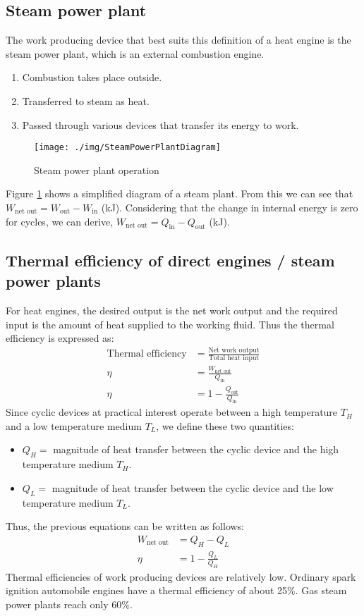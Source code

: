 \subsection{Steam power plant}
The work producing device that best suits this definition of a heat engine is the steam power plant, which is an external combustion engine.
\begin{enumerate}[noitemsep]
  \item Combustion takes place outside.
  \item Transferred to steam as heat.
  \item Passed through various devices that transfer its energy to work.
\end{enumerate}
\begin{figure}[H]
  \centering
  \texttt{[image: ./img/SteamPowerPlantDiagram]}
  \caption{Steam power plant operation}
  \label{steampowerplant}
\end{figure}
Figure \ref{steampowerplant} shows a simplified diagram of a steam plant. From this we can see that \(W_{\textrm{net out}} = W_{\textrm{out}} - W_{\textrm{in}}\) (\si{\kilo\joule}). Considering that the change in internal energy is zero for cycles, we can derive, \(W_{\textrm{net out}} = Q_{\textrm{in}} - Q_{\textrm{out}}\) (\si{\kilo\joule}).
\subsection{Thermal efficiency of direct engines / steam power plants}
For heat engines, the desired output is the net work output and the required input is the amount of heat supplied to the working fluid. Thus the thermal efficiency is expressed as:
\begin{align}
  \textrm{Thermal efficiency} & = \frac{\textrm{Net work output}}{\textrm{Total heat input}} \\
  \eta                        & = \frac{W_{\textrm{net out}}}{Q_{\textrm{in}}}               \\
  \eta                        & = 1 - \frac{Q_{\textrm{out}}}{Q_{\textrm{in}}}
\end{align}
Since cyclic devices at practical interest operate between a high temperature \(T_H\) and a low temperature medium \(T_L\), we define these two quantities:
\begin{itemize}
  \item {\(Q_H =\)} magnitude of heat transfer between the cyclic device and the high temperature medium \(T_H\).
  \item {\(Q_L =\)} magnitude of heat transfer between the cyclic device and the low temperature medium \(T_L\).
\end{itemize}
Thus, the previous equations can be written as follows:
\begin{align}
  W_{\textrm{net out}} & = Q_H - Q_L           \\
  \eta                 & = 1 - \frac{Q_L}{Q_H}
\end{align}
Thermal efficiencies of work producing devices are relatively low. Ordinary spark ignition automobile engines have a thermal efficiency of about 25\%. Gas steam power plants reach only 60\%.
